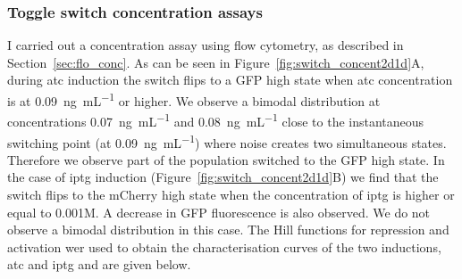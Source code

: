 \subsubsection{Toggle switch concentration assays}

I carried out a concentration assay using flow cytometry, as described in Section~\ref{sec:flo_conc}. As can be seen in Figure~\ref{fig:switch_concent2d1d}A, during \acrshort{atc} induction the switch flips to a GFP high state when \acrshort{atc} concentration is at \SI{0.09}{\nano\gram\per\milli\liter} or higher. We observe a bimodal distribution at concentrations \SI{0.07}{\nano\gram\per\milli\liter} and \SI{0.08}{\nano\gram\per\milli\liter} close to the instantaneous switching point (at \SI{0.09}{\nano\gram\per\milli\liter}) where noise creates two simultaneous states. Therefore we observe part of the population switched to the GFP high state. In the case of \acrshort{iptg} induction (Figure~\ref{fig:switch_concent2d1d}B) we find that the switch flips to the mCherry high state when the concentration of \acrshort{iptg} is higher or equal to 0.001M. A decrease in GFP fluorescence is also observed. We do not observe a bimodal distribution in this case. The Hill functions for repression and activation wer used to obtain the characterisation curves of the two inductions, \acrshort{atc} and \acrshort{iptg} and are given below. 

